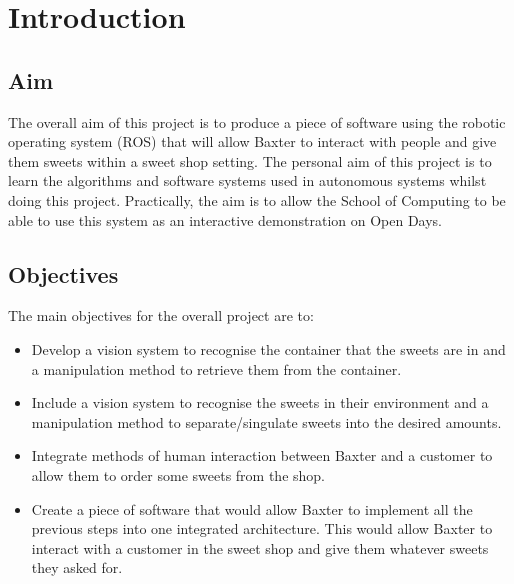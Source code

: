 \chapter{Introduction}
\label{chapter1}
\section{Aim}
The overall aim of this project is to produce a piece of software using the robotic operating system (ROS) that will allow Baxter to interact with people and give them sweets within a sweet shop setting. The personal aim of this project is to learn the algorithms and software systems used in autonomous systems whilst doing this project. Practically, the aim is to allow the School of Computing to be able to use this system as an interactive demonstration on Open Days.
\section{Objectives}
The main objectives for the overall project are to:
\begin{itemize}
    \item{Develop a vision system to recognise the container that the sweets are in and a manipulation method to retrieve them from the container.}
    \item{Include a vision system to recognise the sweets in their environment and a manipulation method to separate/singulate sweets into the desired amounts.}
    \item{Integrate methods of human interaction between Baxter and a customer to allow them to order some sweets from the shop.}
    \item{Create a piece of software that would allow Baxter to implement all the previous steps into one integrated architecture. This would allow Baxter to interact with a customer in the sweet shop and give them whatever sweets they asked for.}
\end{itemize}
